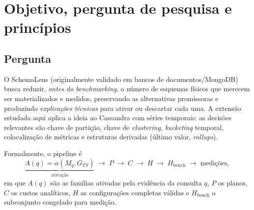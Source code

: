 \documentclass[11pt,a4paper]{article}
\begin{document}
\section{Objetivo, pergunta de pesquisa e princípios}

\subsection{Pergunta}
O SchemaLens (originalmente validado em bancos de documentos/MongoDB) busca reduzir, \emph{antes do benchmarking}, o número de esquemas físicos que merecem ser materializados e medidos, preservando as alternativas promissoras e produzindo \emph{explicações técnicas} para ativar ou descartar cada uma. A extensão estudada aqui aplica a ideia ao Cassandra com séries temporais: as decisões relevantes são chave de partição, chave de \emph{clustering}, \emph{bucketing} temporal, colocalização de métricas e estruturas derivadas (último valor, \emph{rollups}).

Formalmente, o pipeline é
\[
\underbrace{A(q)=\alpha(M_q, G_{TS})}_{\text{ativação}} \;\to\; P \;\to\; C \;\to\; H \;\to\; H_{\text{bench}} \;\to\; \text{medições},
\]
em que $A(q)$ são as famílias ativadas pela evidência da consulta $q$, $P$ os planos, $C$ os custos analíticos, $H$ as configurações completas válidas e $H_{\text{bench}}$ o subconjunto congelado para medição.
\end{document}
